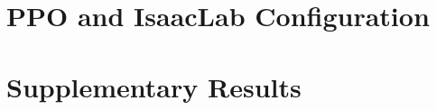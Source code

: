 \chapter{PPO and IsaacLab Configuration}
\label{app:ppo-config}

\chapter{Supplementary Results}
\label{app:results}

